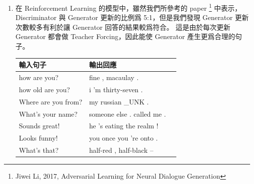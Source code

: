 \documentclass[12pt, a4paper]{article}
\theoremstyle{mystyle}	%
\begin{document}
\begin{enumerate}
\item 在 Reinforcement Learning 的模型中，雖然我們所參考的 paper
  \footnote{Jiwei Li, 2017, Adversarial Learning for Neural Dialogue Generation}
  中表示，Discriminator 與 Generator 更新的比例爲 5:1，但是我們發現
  Generator 更新次數較多有利於讓 Generator 回答的結果較爲符合。
  這是由於每次更新 Generator 都會做 Teacher Forcing，因此能使 Generator
  產生更爲合理的句子。 \\
  \begin{tabular}{lll}
    \hline
    輸入句子            & 輸出回應         \\
    \hline
    \hline
    how are you?        &  fine , macaulay .            \\
    \hline                                            
    how old are you?    &  i 'm thirty-seven .         \\
    \hline                                            
    Where are you from? &  my russian \_UNK .          \\
    \hline                                            
    What's your name?   &  someone else . called me . \\
    \hline                                            
    Sounds great!       &  he 's eating the realm !   \\
    \hline                                            
    Looks funny!        &  you once you 're onto .    \\
    \hline                                            
    What's that?        &  half-red , half-black --   \\
    \hline   
  \end{tabular}
\end{enumerate}
\end{document}
